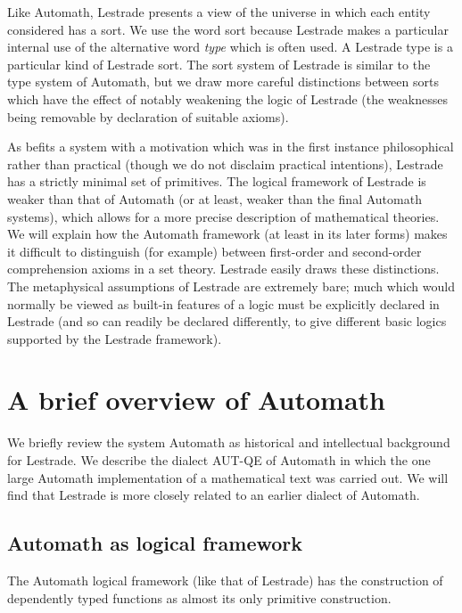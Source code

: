 \documentclass[12pt]{article}
\begin{document}
Like Automath, Lestrade presents a view of the universe in which each entity considered has a sort.  We use the word sort because Lestrade makes a particular internal use of the alternative word {\em type\/} which is often used.  A Lestrade type is a particular kind of Lestrade sort.  The sort system of Lestrade is similar to the type system of Automath, but we draw more careful distinctions between sorts which have the effect of notably weakening the logic of Lestrade (the weaknesses being removable by declaration of suitable axioms).

As befits a system with a motivation which was in the first instance philosophical rather than practical (though we do not disclaim practical intentions), Lestrade has a strictly minimal set of primitives.  The logical framework of Lestrade is weaker than that of Automath (or at least, weaker than the final Automath systems), which allows for a more precise description of mathematical theories.  We will explain how the Automath framework (at least in its later forms) makes it difficult to distinguish (for example) between first-order and second-order comprehension axioms in a set theory.  Lestrade easily draws these distinctions.  The metaphysical assumptions of Lestrade are extremely bare;  much which would normally be viewed as built-in features of a logic must be explicitly declared in Lestrade (and so can readily be declared differently, to give different basic logics supported by the Lestrade framework).

\newpage

\section{A brief overview of Automath}

We briefly review the system Automath as historical and intellectual background for Lestrade.  We describe the dialect AUT-QE of Automath in which the one large Automath implementation of a mathematical text was carried out.  We will find that Lestrade is more closely related to an earlier dialect of Automath.

\subsection{Automath as logical framework}

The Automath logical framework (like that of Lestrade) has the construction of dependently typed functions as almost its only primitive construction.
\end{document}
